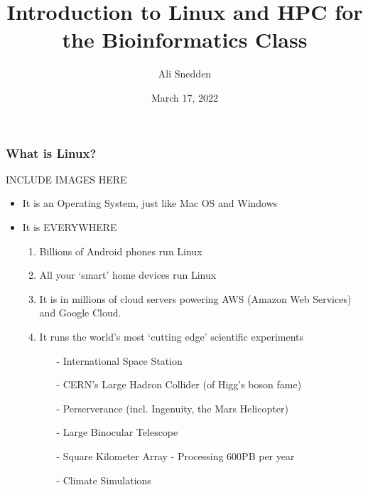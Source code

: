 \documentclass{beamer}
\title{Introduction to Linux and HPC for the Bioinformatics Class}
\author{Ali Snedden}
\institute{Nationwide Children's Hospital}
\date{March 17, 2022}
\begin{document}
 
\frame{\titlepage}

\begin{frame}
\frametitle{What is Linux?}
INCLUDE IMAGES HERE
\begin{itemize}
    \item It is an Operating System, just like Mac OS and Windows  
    \pause 
    \item It is EVERYWHERE
    \begin{enumerate}
        \item Billions of Android phones run Linux
        \pause 
        \item All your `smart' home devices run Linux
        \pause 
        \item It is in millions of cloud servers powering AWS (Amazon Web Services) and Google Cloud.
        \pause 
        \item It runs the world's most `cutting edge' scientific experiments
        \begin{itemize}
            \item[-] International Space Station
            \pause
            \item[-] CERN's Large Hadron Collider (of Higg's boson fame)
            \pause
            \item[-] Perserverance (incl. Ingenuity, the Mars Helicopter)
            \pause
            \item[-] Large Binocular Telescope
            \pause
            \item[-] Square Kilometer Array - Processing 600PB per year
            \pause
            \item[-] Climate Simulations 
            \pause
        \end{itemize}
    \end{enumerate}
\end{itemize}
\end{frame}
\end{document}
